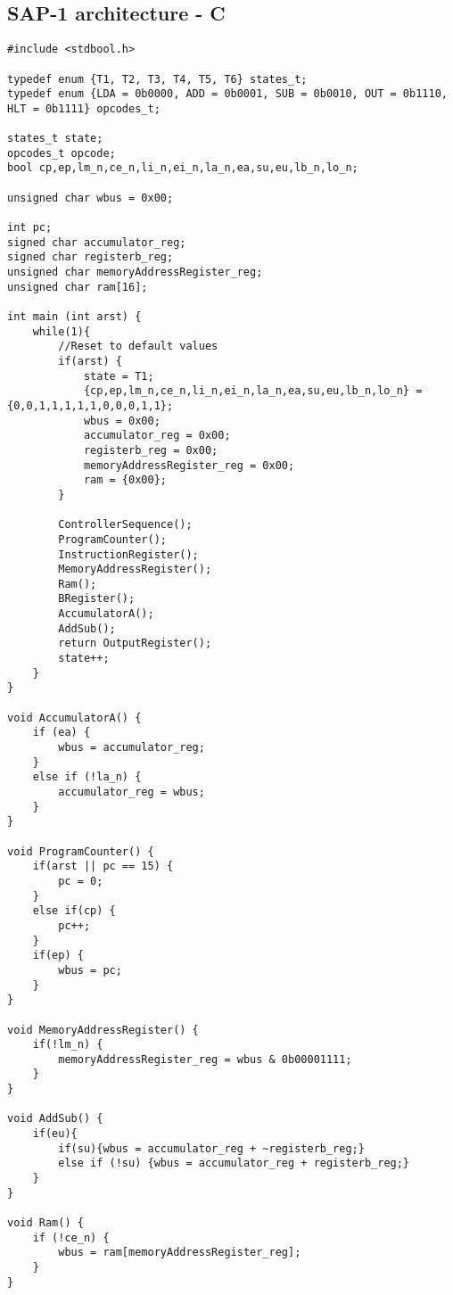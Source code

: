 \subsection{SAP-1 architecture - C}
\lstset{language=C,style=Cstyle}
\begin{lstlisting}[caption={SAP-1 architecture implemented in C},label=lst:sap1archc]
#include <stdbool.h>

typedef enum {T1, T2, T3, T4, T5, T6} states_t;
typedef enum {LDA = 0b0000, ADD = 0b0001, SUB = 0b0010, OUT = 0b1110, HLT = 0b1111} opcodes_t;

states_t state;
opcodes_t opcode;
bool cp,ep,lm_n,ce_n,li_n,ei_n,la_n,ea,su,eu,lb_n,lo_n; 
 
unsigned char wbus = 0x00;

int pc;
signed char accumulator_reg;
signed char registerb_reg;
unsigned char memoryAddressRegister_reg;
unsigned char ram[16];
 
int main (int arst) {
	while(1){
		//Reset to default values
		if(arst) {
			state = T1;
			{cp,ep,lm_n,ce_n,li_n,ei_n,la_n,ea,su,eu,lb_n,lo_n} = {0,0,1,1,1,1,1,0,0,0,1,1};
			wbus = 0x00;
			accumulator_reg = 0x00;
			registerb_reg = 0x00;
			memoryAddressRegister_reg = 0x00;
			ram = {0x00};
		}
		
		ControllerSequence();
		ProgramCounter();
		InstructionRegister();
		MemoryAddressRegister();
		Ram();
		BRegister();
		AccumulatorA();
		AddSub();
		return OutputRegister();
		state++;
	}
}

void AccumulatorA() {
	if (ea) {
		wbus = accumulator_reg;
	}
	else if (!la_n) {
		accumulator_reg = wbus;
	}
}

void ProgramCounter() {
	if(arst || pc == 15) {
		pc = 0;
	}
	else if(cp) {
		pc++;
	}
	if(ep) {
		wbus = pc;
	}
}

void MemoryAddressRegister() {
	if(!lm_n) {
		memoryAddressRegister_reg = wbus & 0b00001111;
	}
}

void AddSub() {
	if(eu){
		if(su){wbus = accumulator_reg + ~registerb_reg;}
		else if (!su) {wbus = accumulator_reg + registerb_reg;}
	}
}

void Ram() {
	if (!ce_n) {
		wbus = ram[memoryAddressRegister_reg];
	}
}


\end{lstlisting}
